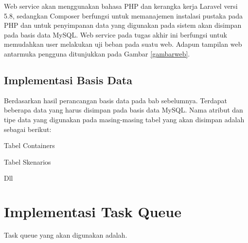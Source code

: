		\indent Web service akan menggunakan bahasa PHP dan kerangka kerja Laravel versi 5.8, sedangkan Composer berfungsi untuk memanajemen instalasi pustaka pada PHP dan untuk penyimpanan data yang digunakan pada sistem akan disimpan pada basis data MySQL. Web service pada tugas akhir ini berfungsi untuk memudahkan user melakukan uji beban pada suatu web. Adapun tampilan web antarmuka pengguna ditunjukkan pada Gambar \ref{gambarweb}.
		
		\subsection{Implementasi Basis Data}
			Berdasarkan hasil perancangan basis data pada bab sebelumnya. Terdapat beberapa data yang harus disimpan pada basis data MySQL. Nama atribut dan tipe data yang digunakan pada masing-masing tabel yang akan disimpan adalah sebagai berikut:
			
			Tabel Containers
			
			Tabel Skenarios
			
			Dll
			
	\section{Implementasi Task Queue}
		Task queue yang akan digunakan adalah.
	